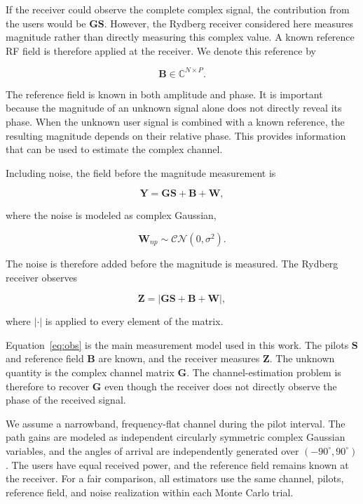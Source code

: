 \documentclass[journal]{IEEEtran}
\newcommand{\bG}{\mathbf{G}}
\newcommand{\bS}{\mathbf{S}}
\newcommand{\bB}{\mathbf{B}}
\newcommand{\bW}{\mathbf{W}}
\newcommand{\bZ}{\mathbf{Z}}
\newcommand{\bY}{\mathbf{Y}}
\newcommand{\CN}{\mathcal{CN}}
\begin{document}
If the receiver could observe the complete complex signal, the contribution
from the users would be $\bG\bS$. However, the Rydberg receiver considered
here measures magnitude rather than directly measuring this complex value.
A known reference RF field is therefore applied at the receiver. We denote
this reference by

\begin{equation}
\bB
\in
\mathbb{C}^{N\times P}.
\end{equation}

The reference field is known in both amplitude and phase. It is important
because the magnitude of an unknown signal alone does not directly reveal
its phase. When the unknown user signal is combined with a known reference,
the resulting magnitude depends on their relative phase. This provides
information that can be used to estimate the complex channel.

Including noise, the field before the magnitude measurement is

\begin{equation}
\bY
=
\bG\bS+\bB+\bW,
\end{equation}

where the noise is modeled as complex Gaussian,

\begin{equation}
\bW_{np}
\sim
\CN(0,\sigma^2).
\end{equation}

The noise is therefore added before the magnitude is measured. The Rydberg
receiver observes

\begin{equation}
\bZ
=
\left|
\bG\bS+\bB+\bW
\right|,
\label{eq:obs}
\end{equation}

where $|\cdot|$ is applied to every element of the matrix.

Equation~\eqref{eq:obs} is the main measurement model used in this work.
The pilots $\bS$ and reference field $\bB$ are known, and the receiver
measures $\bZ$. The unknown quantity is the complex channel matrix $\bG$.
The channel-estimation problem is therefore to recover $\bG$ even though
the receiver does not directly observe the phase of the received signal.

We assume a narrowband, frequency-flat channel during the pilot interval.
The path gains are modeled as independent circularly symmetric complex
Gaussian variables, and the angles of arrival are independently generated
over $(-90^\circ,90^\circ)$. The users have equal received power, and the
reference field remains known at the receiver. For a fair comparison, all
estimators use the same channel, pilots, reference field, and noise
realization within each Monte Carlo trial.
\end{document}
